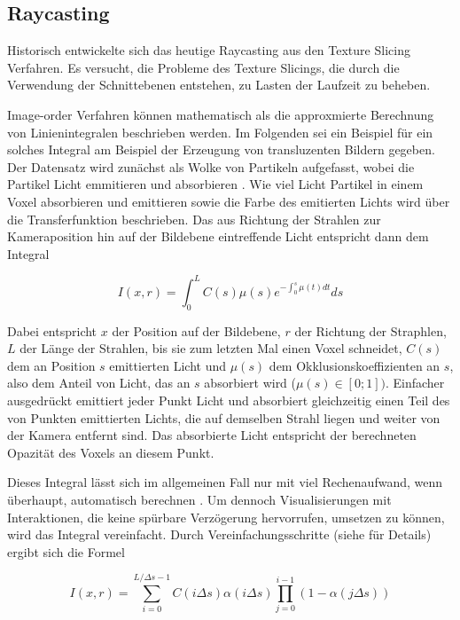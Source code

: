\documentclass[a4paper,fontsize=12pt,toc=bib,halfparskip,ngerman]{scrartcl}
\begin{document}
\subsection{Raycasting}
\label{sec:Raycasting}

Historisch entwickelte sich das heutige Raycasting aus den Texture Slicing Verfahren. Es versucht, die Probleme des Texture Slicings, die durch die Verwendung der Schnittebenen entstehen, zu Lasten der Laufzeit zu beheben.

Image-order Verfahren k\"onnen mathematisch als die approxmierte Berechnung von Linienintegralen beschrieben werden. Im Folgenden sei ein Beispiel f\"ur ein solches Integral am Beispiel der Erzeugung von transluzenten Bildern gegeben.
Der Datensatz wird zun\"achst als Wolke von Partikeln aufgefasst, wobei die Partikel Licht emmitieren und absorbieren \cite[s.~134~f.]{hansen2005visualization}. Wie viel Licht Partikel in einem Voxel absorbieren und emittieren sowie die Farbe des emitierten Lichts wird \"uber die Transferfunktion beschrieben. Das aus Richtung der Strahlen zur Kameraposition hin auf der Bildebene eintreffende Licht entspricht dann dem Integral 

\begin{equation}
I(x,r) = \int_{0}^{L} C(s)\mu(s) e^{-\int_{0}^{s}\mu(t)dt}ds
\end{equation}

Dabei entspricht $x$ der Position auf der Bildebene, $r$ der Richtung der Straphlen, $L$ der L\"ange der Strahlen, bis sie zum letzten Mal einen Voxel schneidet, $C(s)$ dem an Position $s$ emittierten Licht und $\mu(s)$ dem Okklusionskoeffizienten an $s$, also dem Anteil von Licht, das an $s$ absorbiert wird ($\mu(s) \in [0;1])$. Einfacher ausgedr\"uckt emittiert jeder Punkt Licht und absorbiert gleichzeitig einen Teil des von Punkten emittierten Lichts, die auf demselben Strahl liegen und weiter von der Kamera entfernt sind. Das absorbierte Licht entspricht der berechneten Opazit\"at des Voxels an diesem Punkt.

Dieses Integral l\"asst sich im allgemeinen Fall nur mit viel Rechenaufwand, wenn \"uberhaupt, automatisch berechnen \cite[S.~136]{hansen2005visualization}. Um dennoch Visualisierungen mit Interaktionen, die keine sp\"urbare Verz\"ogerung hervorrufen, umsetzen zu k\"onnen, wird das Integral vereinfacht. Durch Vereinfachungsschritte (siehe \cite[S.~136]{hansen2005visualization} f\"ur Details) ergibt sich die Formel

\begin{equation}
I(x,r) = \sum_{i=0}^{L/\Delta s - 1} C(i\Delta s)\alpha(i\Delta s) \prod_{j=0}^{i-1}( 1 - \alpha(j \Delta s))
\end{equation}
\end{document}

